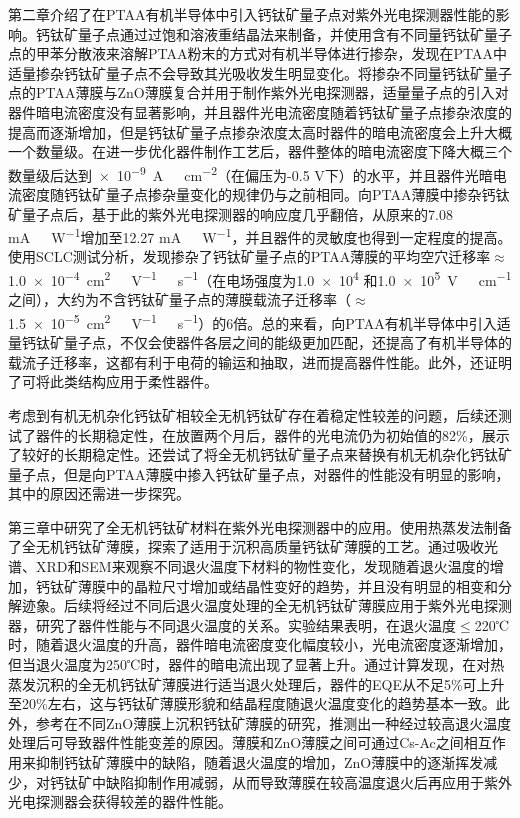 \documentclass[forlib]{WHUMaster}   %
\begin{document}
{第二章介绍了在PTAA有机半导体中引入钙钛矿量子点对紫外光电探测器性能的影响。钙钛矿量子点通过过饱和溶液重结晶法来制备，并使用含有不同量钙钛矿量子点的甲苯分散液来溶解PTAA粉末的方式对有机半导体进行掺杂，发现在PTAA中适量掺杂钙钛矿量子点不会导致其光吸收发生明显变化。将掺杂不同量钙钛矿量子点的PTAA薄膜与ZnO薄膜复合并用于制作紫外光电探测器，适量量子点的引入对器件暗电流密度没有显著影响，并且器件光电流密度随着钙钛矿量子点掺杂浓度的提高而逐渐增加，但是钙钛矿量子点掺杂浓度太高时器件的暗电流密度会上升大概一个数量级。在进一步优化器件制作工艺后，器件整体的暗电流密度下降大概三个数量级后达到\num{e-9}\ \si{A\ cm^{-2}}（在偏压为-0.5 V下）的水平，并且器件光暗电流密度随钙钛矿量子点掺杂量变化的规律仍与之前相同。向PTAA薄膜中掺杂钙钛矿量子点后，基于此的紫外光电探测器的响应度几乎翻倍，从原来的7.08 \si{mA\ W^{-1}}增加至12.27 \si{mA\ W^{-1}}，并且器件的灵敏度也得到一定程度的提高。使用SCLC测试分析，发现掺杂了钙钛矿量子点的PTAA薄膜的平均空穴迁移率$\approx$ \num{1.0e-4}\ \si{cm^2\ V^{-1}\ s^{-1}}（在电场强度为\num{1.0e4} 和\num{1.0e5}\ \si{V \ cm^{-1}} 之间），大约为不含钙钛矿量子点的薄膜载流子迁移率（$\approx$ \num{1.5e-5}\ \si{cm^2\ V^{-1}\ s^{-1}}）的6倍。总的来看，向PTAA有机半导体中引入适量钙钛矿量子点，不仅会使器件各层之间的能级更加匹配，还提高了有机半导体的载流子迁移率，这都有利于电荷的输运和抽取，进而提高器件性能。此外，还证明了可将此类结构应用于柔性器件。

考虑到有机无机杂化钙钛矿相较全无机钙钛矿存在着稳定性较差的问题，后续还测试了器件的长期稳定性，在放置两个月后，器件的光电流仍为初始值的82\%，展示了较好的长期稳定性。还尝试了将全无机钙钛矿量子点来替换有机无机杂化钙钛矿量子点，但是向PTAA薄膜中掺入钙钛矿量子点，对器件的性能没有明显的影响，其中的原因还需进一步探究。

第三章中研究了全无机钙钛矿材料在紫外光电探测器中的应用。使用热蒸发法制备了全无机钙钛矿薄膜，探索了适用于沉积高质量钙钛矿薄膜的工艺。通过吸收光谱、XRD和SEM来观察不同退火温度下材料的物性变化，发现随着退火温度的增加，钙钛矿薄膜中的晶粒尺寸增加或结晶性变好的趋势，并且没有明显的相变和分解迹象。后续将经过不同后退火温度处理的全无机钙钛矿薄膜应用于紫外光电探测器，研究了器件性能与不同退火温度的关系。实验结果表明，在退火温度$\leq$220℃时，随着退火温度的升高，器件暗电流密度变化幅度较小，光电流密度逐渐增加，但当退火温度为250℃时，器件的暗电流出现了显著上升。通过计算发现，在对热蒸发沉积的全无机钙钛矿薄膜进行适当退火处理后，器件的EQE从不足5\%可上升至20\%左右，这与钙钛矿薄膜形貌和结晶程度随退火温度变化的趋势基本一致。此外，参考在不同ZnO薄膜上沉积钙钛矿薄膜的研究，推测出一种经过较高退火温度处理后可导致器件性能变差的原因。薄膜和ZnO薄膜之间可通过Cs-Ac之间相互作用来抑制钙钛矿薄膜中的缺陷，随着退火温度的增加，ZnO薄膜中的逐渐挥发减少，对钙钛矿中缺陷抑制作用减弱，从而导致薄膜在较高温度退火后再应用于紫外光电探测器会获得较差的器件性能。

}
\end{document}
